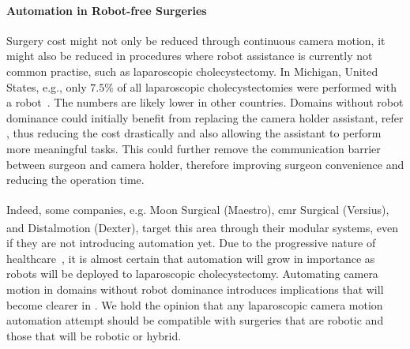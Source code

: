 \paragraph{Automation in Robot-free Surgeries} Surgery cost might not only be reduced through continuous camera motion, it might also be reduced in procedures where robot assistance is currently not common practise, such as laparoscopic cholecystectomy. In Michigan, United States, e.g., only $7.5\%$ of all laparoscopic cholecystectomies were performed with a robot~\cite{sheetz2020trends}. The numbers are likely lower in other countries. Domains without robot dominance could initially benefit from replacing the camera holder assistant, refer , thus reducing the cost drastically and also allowing the assistant to perform more meaningful tasks. This could further remove the communication barrier between surgeon and camera holder, therefore improving surgeon convenience and reducing the operation time. 

Indeed, some companies, e.g. Moon Surgical (Maestro\textsuperscript{\textregistered}), \gls{cmr} Surgical (Versius\textsuperscript{\textregistered}), and Distalmotion (Dexter\textsuperscript{\textregistered}), target this area through their modular systems, even if they are not introducing automation yet. Due to the progressive nature of healthcare~\cite{chatterjee2024advancements}, it is almost certain that automation will grow in importance as robots will be deployed to laparoscopic cholecystectomy. Automating camera motion in domains without robot dominance introduces implications that will become clearer in . We hold the opinion that any laparoscopic camera motion automation attempt should be compatible with surgeries that are robotic and those that will be robotic or hybrid.







